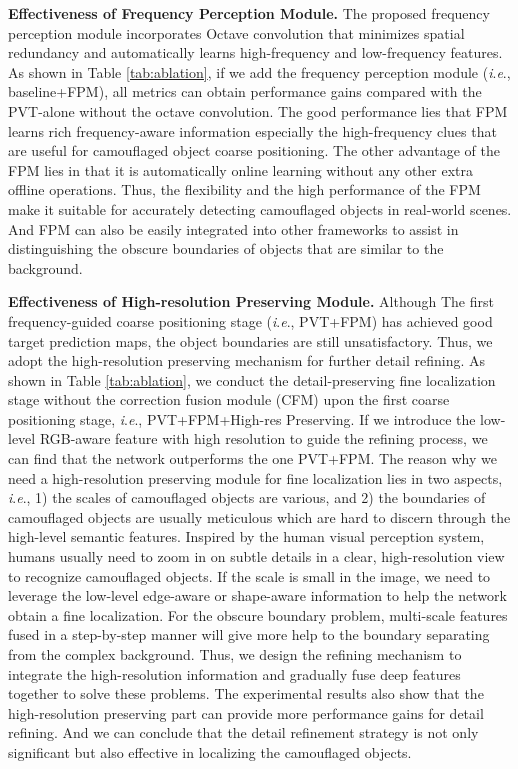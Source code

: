 \documentclass[sigconf,screen]{acmart}
\newcommand{\ie}{\textit{i}.\textit{e}.}
\begin{document}
\noindent \textbf{Effectiveness of Frequency Perception Module.}
The proposed frequency perception module incorporates Octave convolution \cite{r40} that minimizes spatial redundancy and automatically learns high-frequency and low-frequency features. As shown in Table \ref{tab:ablation}, if we add the frequency perception module (\ie, baseline+FPM), all metrics can obtain performance gains compared with the PVT-alone without the octave convolution. The good performance lies that FPM learns 
rich frequency-aware information especially the high-frequency clues that are useful for camouflaged object coarse positioning. 
The other advantage of the FPM lies in that it is automatically online learning without any other extra offline operations. Thus, the flexibility and the high performance of the FPM make it suitable for accurately detecting camouflaged objects in real-world scenes. And FPM can also be easily integrated into other frameworks to assist in distinguishing the obscure boundaries of objects that are similar to the background.     





\noindent \textbf{Effectiveness of High-resolution Preserving Module.}
Although The first frequency-guided coarse positioning stage (\ie, PVT+FPM) has achieved good target prediction maps, the object boundaries are still unsatisfactory. Thus, we adopt the high-resolution preserving mechanism for further detail refining. As shown in Table \ref{tab:ablation}, we conduct the detail-preserving fine localization stage without the correction fusion module (CFM) upon the first coarse positioning stage, \ie, PVT+FPM+High-res Preserving. If we introduce the low-level RGB-aware feature with high resolution to guide the refining process, we can find that the network outperforms the one PVT+FPM. The reason why we need a high-resolution preserving module for fine localization lies in two aspects, \ie, 1) the scales of camouflaged objects are various, and 2) the boundaries of camouflaged objects are usually meticulous which are hard to discern through the high-level semantic features. Inspired by the human visual perception system, humans usually need to zoom in on subtle details in a clear, high-resolution view to recognize camouflaged objects. If the scale is small in the image, we need to leverage the low-level edge-aware or shape-aware information to help the network obtain a fine localization. For the obscure boundary problem, multi-scale features fused in a step-by-step manner will give more help to the boundary separating from the complex background. Thus, we design the refining mechanism to integrate the high-resolution information and gradually fuse deep features together to solve these problems. 
The experimental results also show that the high-resolution preserving part can provide more performance gains for detail refining. 
And we can conclude that the detail refinement strategy is not only significant but also effective in localizing the camouflaged objects.
\end{document}
